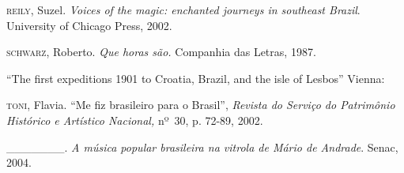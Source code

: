 \begin{Parskip}
\textsc{reily}, Suzel. \emph{Voices of the magic: enchanted journeys in southeast
Brazil}. University of Chicago Press, 2002.

\textsc{schwarz}, Roberto. \emph{Que horas são.} Companhia das Letras, 1987.

``The first expeditions 1901 to Croatia, Brazil, and the isle of Lesbos''
Vienna:‎

\textsc{toni}, Flavia. ``Me fiz brasileiro para o Brasil'', \emph{Revista do
Serviço do Patrimônio Histórico e Artístico Nacional,} nº~30, p. 72-89,
2002.

\_\_\_\_\_\_\_. \emph{A música popular brasileira na vitrola de Mário de
Andrade}. Senac, 2004.
\end{Parskip}